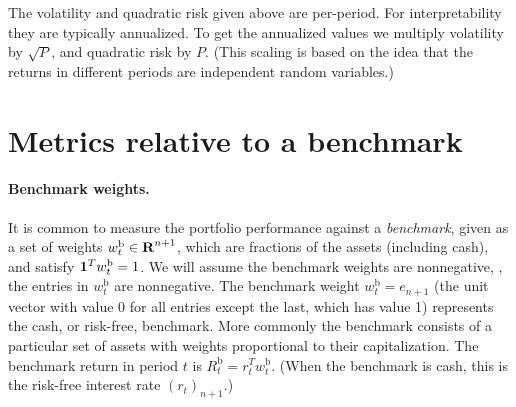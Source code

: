 \documentclass[openany]{now}
\newcommand{\Rb}{R^\mathrm{b}}
\newcommand{\wb}{w^\mathrm{b}}
\begin{document}

The volatility and quadratic risk given above are per-period. For interpretability
they are typically annualized.  To get the annualized values
we multiply volatility by $\sqrt P$, and quadratic risk by $P$.  (This scaling
is based on the idea that the returns in different periods are
independent random variables.)

\section{Metrics relative to a benchmark}
\label{s-relativemetrics}

\paragraph{Benchmark weights.}
It is common to measure the portfolio performance against a
\emph{benchmark}, given as a set of weights
$\wb_t \in \reals^{n+1}$, which are fractions of the assets (including cash),
and satisfy $\ones^T \wb_t=1$.
We will assume the benchmark weights are nonnegative, \ie,
the entries in $\wb_t$ are nonnegative.
The benchmark weight $\wb_t = e_{n+1}$
(the unit vector with value 0 for all entries
except the last, which has value 1) represents the cash, or risk-free, benchmark.
More commonly the benchmark consists of a particular set of assets
with weights proportional to their capitalization.
The benchmark return in period $t$ is $\Rb_t = r_t^T\wb_t$.
(When the benchmark is cash, this is the risk-free interest rate $(r_t)_{n+1}$.)
\end{document}
